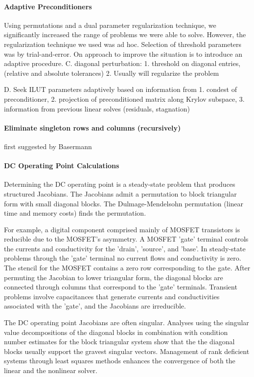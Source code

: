 \documentclass[10pt,fleqn]{article}
\begin{document}
\paragraph{Adaptive Preconditioners}
Using permutations and a dual parameter regularization technique, we
significantly increased the range of problems we were able to solve.
However, the regularization technique we used was ad hoc.  Selection
of threshold parameters was by trial-and-error.  On approach to
improve the situation is to introduce an adaptive procedure.
C. diagonal perturbation: 
1. threshold on diagonal entries, (relative and absolute tolerances)
2. Usually will regularize the problem 

D. Seek ILUT parameters adaptively based on information from 
1. condest of preconditioner,
2. projection of preconditioned matrix along Krylov subspace,
3. information from previous linear solves (residuals, stagnation)

\paragraph{Eliminate singleton rows and columns (recursively)}
first suggested by  Basermann

\paragraph{DC Operating Point Calculations}
Determining the DC operating point is a steady-state problem that
produces structured Jacobians.  The Jacobians admit a permutation to
block triangular form with small diagonal blocks.  The Dulmage-Mendelsohn
permutation (linear time and memory costs) finds the permutation.

For example, a digital component comprised mainly of MOSFET transistors
is reducible due to the MOSFET's asymmetry.  A MOSFET 'gate' terminal
controls the currents and conductivity for the 'drain', 'source', 
and 'base'.  In steady-state problems through the 'gate' terminal
no current flows and conductivity is zero.  The stencil for the MOSFET
contains a zero row corresponding to the gate.  After permuting the
Jacobian  to lower triangular form, the diagonal blocks are connected
through columns that correspond to the 'gate' terminals.  Transient
problems involve capacitances that generate currents and conductivities
associated with the 'gate', and the Jacobians are irreducible.

The DC operating point Jacobians are often singular.  Analyses using
the singular value decompositions of the diagonal blocks in combination
with condition number estimates for the block triangular system show
that the the diagonal blocks usually support the gravest singular vectors.
Management of rank deficient systems through least squares methods
enhances the convergence of both the linear and the nonlinear solver.

\nopagebreak
\scriptsize

\end{document}
